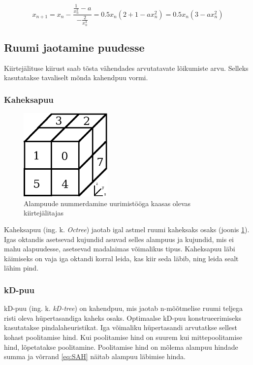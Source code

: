 \documentclass[a4paper,12pt]{report}
\begin{document}
\begin{equation} \label{eq:vec-5}
x_{n+1} = x_n - \frac {\frac 1{x_n^2} - a}{-\frac 2{x_n^3}} = 0.5x_n(2 + 1 - ax_n^2) = 0.5x_n(3-ax_n^2)
\end{equation}

\subsection{Ruumi jaotamine puudesse}
Kiirtejälituse kiirust saab tõsta vähendades arvutatavate lõikumiste arvu.
Selleks kasutatakse tavaliselt mõnda kahendpuu vormi.

\subsubsection{Kaheksapuu}
\begin{figure}
\includegraphics[width=0.4\textwidth]{octree}
\caption{Alampuude nummerdamine uurimistööga kaasas olevas kiirtejälitajas}
\label{fig:octree}
\end{figure}
Kaheksapuu (ing. k. \textit{Octree}) jaotab igal astmel ruumi kaheksaks
osaks (joonis \ref{fig:octree}). Igas oktandis asetsevad kujundid asuvad selles alampuus ja kujundid,
mis ei mahu alapuudesse, asetsevad madalaimas võimalikus tipus. Kaheksapuu
läbi käimiseks on vaja iga oktandi korral leida, kas kiir seda läbib, ning
leida sealt lähim pind.

\subsubsection{kD-puu}
kD-puu (ing. k. \textit{kD-tree}) on kahendpuu, mis jaotab n-mõõtmelise
ruumi teljega risti oleva hüpertasandiga kaheks osaks. Optimaalse kD-puu
konstrueerimiseks kasutatakse pindalaheuristikat. Iga võimaliku hüpertasandi
arvutatkse sellest kohast poolitamise hind. Kui poolitamise hind on suurem
kui mittepoolitamise hind, lõpetatakse poolitamine. Poolitamise hind on
mõlema alampuu hindade summa ja võrrand \ref{eq:SAH} näitab alampuu 
läbimise hinda.
\end{document}
